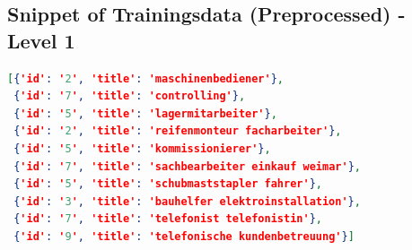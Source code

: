 \documentclass[12pt, a4paper, titlepage]{article}
\begin{document}
\subsection*{Snippet of Trainingsdata (Preprocessed) - Level 1}
\begin{lstlisting}[language=json, firstnumber=1]
[{'id': '2', 'title': 'maschinenbediener'},
 {'id': '7', 'title': 'controlling'},
 {'id': '5', 'title': 'lagermitarbeiter'},
 {'id': '2', 'title': 'reifenmonteur facharbeiter'},
 {'id': '5', 'title': 'kommissionierer'},
 {'id': '7', 'title': 'sachbearbeiter einkauf weimar'},
 {'id': '5', 'title': 'schubmaststapler fahrer'},
 {'id': '3', 'title': 'bauhelfer elektroinstallation'},
 {'id': '7', 'title': 'telefonist telefonistin'},
 {'id': '9', 'title': 'telefonische kundenbetreuung'}]
\end{lstlisting}
\end{document}
